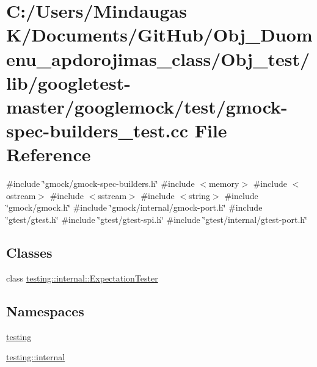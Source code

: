 \hypertarget{_obj__test_2lib_2googletest-master_2googlemock_2test_2gmock-spec-builders__test_8cc}{}\section{C\+:/\+Users/\+Mindaugas K/\+Documents/\+Git\+Hub/\+Obj\+\_\+\+Duomenu\+\_\+apdorojimas\+\_\+class/\+Obj\+\_\+test/lib/googletest-\/master/googlemock/test/gmock-\/spec-\/builders\+\_\+test.cc File Reference}
\label{_obj__test_2lib_2googletest-master_2googlemock_2test_2gmock-spec-builders__test_8cc}
{\ttfamily \#include \char`\"{}gmock/gmock-\/spec-\/builders.\+h\char`\"{}}\newline
{\ttfamily \#include $<$memory$>$}\newline
{\ttfamily \#include $<$ostream$>$}\newline
{\ttfamily \#include $<$sstream$>$}\newline
{\ttfamily \#include $<$string$>$}\newline
{\ttfamily \#include \char`\"{}gmock/gmock.\+h\char`\"{}}\newline
{\ttfamily \#include \char`\"{}gmock/internal/gmock-\/port.\+h\char`\"{}}\newline
{\ttfamily \#include \char`\"{}gtest/gtest.\+h\char`\"{}}\newline
{\ttfamily \#include \char`\"{}gtest/gtest-\/spi.\+h\char`\"{}}\newline
{\ttfamily \#include \char`\"{}gtest/internal/gtest-\/port.\+h\char`\"{}}\newline
\subsection*{Classes}
\begin{DoxyCompactItemize}
\item 
class \mbox{\hyperlink{classtesting_1_1internal_1_1_expectation_tester}{testing\+::internal\+::\+Expectation\+Tester}}
\end{DoxyCompactItemize}
\subsection*{Namespaces}
\begin{DoxyCompactItemize}
\item 
 \mbox{\hyperlink{namespacetesting}{testing}}
\item 
 \mbox{\hyperlink{namespacetesting_1_1internal}{testing\+::internal}}
\end{DoxyCompactItemize}
